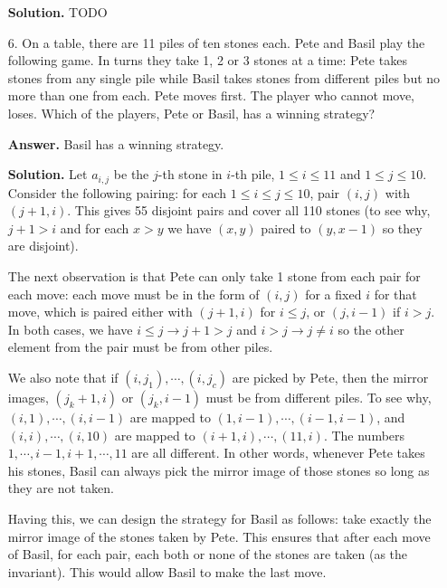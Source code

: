 \documentclass[11pt,a4paper]{article}
\begin{document}
\begin{enumerate}
  \textbf{Solution.} TODO
  
  \item[6.]
  On a table, there are 11 piles of ten stones each. Pete and Basil play the
  following game. In turns they take 1, 2 or 3 stones at a time: Pete takes stones
  from any single pile while Basil takes stones from different piles but no more
  than one from each. Pete moves first. The player who cannot move, loses.
  Which of the players, Pete or Basil, has a winning strategy?
  
  \textbf{Answer.} Basil has a winning strategy. 
  
  \textbf{Solution.} Let $a_{i, j}$ be the $j$-th stone in $i$-th pile, $1\le i\le 11$ and $1\le j\le 10$. 
  Consider the following pairing: 
  for each $1\le i\le j\le 10$, 
  pair $(i, j)$ with $(j+1, i)$. 
  This gives 55 disjoint pairs and cover all 110 stones 
  (to see why, $j+1>i$ and for each $x>y$ we have $(x, y)$ paired to $(y, x-1)$ so they are disjoint). 
  
  The next observation is that Pete can only take 1 stone from each pair for each move: 
  each move must be in the form of $(i, j)$ for a fixed $i$ for that move, which is paired either with $(j+1, i)$ for $i\le j$, 
  or $(j, i-1)$ if $i>j$. 
  In both cases, we have $i\le j\to j+1>j$ and $i>j\to j\neq i$ 
  so the other element from the pair must be from other piles. 
  
  We also note that if $(i, j_1), \cdots, (i, j_c)$ are picked by Pete, 
  then the mirror images, $(j_k+1, i)$ or $(j_k, i-1)$ must be from different piles. 
  To see why, $(i, 1), \cdots, (i, i-1)$ are mapped to $(1, i-1), \cdots, (i-1, i-1)$, 
  and $(i, i), \cdots, (i, 10)$ are mapped to $(i+1, i), \cdots, (11, i)$. 
  The numbers $1, \cdots, i-1, i+1, \cdots, 11$ are all different. 
  In other words, whenever Pete takes his stones, 
  Basil can always pick the mirror image of those stones so long as they are not taken. 
  
  Having this, we can design the strategy for Basil as follows: 
  take exactly the mirror image of the stones taken by Pete. 
  This ensures that after each move of Basil, for each pair, each both or none of the stones are taken (as the invariant). 
  This would allow Basil to make the last move. 
  
\end{enumerate}
\end{document}
